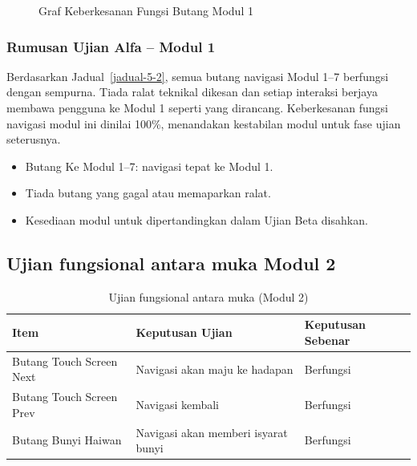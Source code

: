 {{\begin{figure}[h]
\centering
{}
\caption{Graf Keberkesanan Fungsi Butang Modul 1}
\label{rajah-5-2}
\end{figure}

\subsubsection{Rumusan Ujian Alfa – Modul 1}

Berdasarkan Jadual~\ref{jadual-5-2}, semua butang navigasi Modul 1–7 berfungsi dengan sempurna. Tiada ralat teknikal dikesan dan setiap interaksi berjaya membawa pengguna ke Modul 1 seperti yang dirancang. Keberkesanan fungsi navigasi modul ini dinilai 100\%, menandakan kestabilan modul untuk fase ujian seterusnya.

\begin{itemize}[h]
  \item Butang Ke Modul 1–7: navigasi tepat ke Modul 1.
  \item Tiada butang yang gagal atau memaparkan ralat.
  \item Kesediaan modul untuk dipertandingkan dalam Ujian Beta disahkan.
\end{itemize}
\clearpage



\subsection{Ujian fungsional antara muka Modul 2}
\begin{table}[h]
\centering
\caption{Ujian fungsional antara muka (Modul 2)}
\begin{tabular}{lll}
\toprule
\textbf{Item} & \textbf{Keputusan Ujian} & \textbf{Keputusan Sebenar} \\ \midrule
Butang Touch Screen Next & Navigasi akan maju ke hadapan & Berfungsi \\ 
Butang Touch Screen Prev & Navigasi kembali & Berfungsi \\ 
Butang Bunyi Haiwan & Navigasi akan memberi isyarat bunyi & Berfungsi \\ \bottomrule
\end{tabular}
\end{table}

}}

